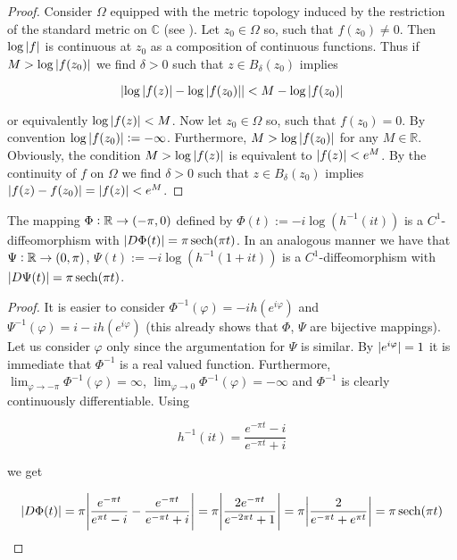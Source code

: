 \begin{proof}
	Consider $\Omega$ equipped with the metric topology induced by the restriction of the standard metric on $\mathbb{C}$ (see \cite[21]{lee:topological_manifolds:2011}). Let $z_0 \in \Omega$ so, such that $f(z_0) \neq 0$. Then $\log\abs[0]{ f}$ is continuous at $z_0$ as a composition of continuous functions. Thus if $M > \log\abs[0]{f(z_0)}$ we find $\delta > 0$ such that $z \in B_\delta(z_0)$ implies 
	
	\begin{equation*}
		\abs[0]{ \log\abs[0]{ f(z)} - \log\abs[0]{ f(z_0)}} < M- \log\abs[0]{ f(z_0)}
	\end{equation*}

	\noindent or equivalently $\log\abs[0]{ f(z)} < M$. Now let $z_0 \in \Omega$ so, such that $f(z_0) = 0$. By convention $\log\abs[0]{ f(z_0)} := -\infty$. Furthermore, $M > \log\abs[0]{ f(z_0)}$ for any $M \in \mathbb{R}$. Obviously, the condition $M > \log\abs[0]{ f(z)}$ is equivalent to $\abs[0]{ f(z)} < e^M$. By the continuity of $f$ on $\Omega$ we find $\delta > 0$ such that $z \in B_\delta(z_0)$ implies $\abs[0]{f(z) - f(z_0)} = \abs[0]{f(z)} < e^M$.
\end{proof}

\begin{lemma}
	The mapping $\Phi: \mathbb{R} \to \intoo{-\pi,0}$ defined by $\Phi(t) := -i\log( h^{-1}(it))$ is a $C^1$-diffeomorphism with $\abs[0]{ D\Phi(t)} = \pi \sech(\pi t)$. In an analogous manner we have that $\Psi: \mathbb{R} \to \intoo{0,\pi}$, $\Psi(t) := -i\log( h^{-1}(1 + it) )$ is a $C^1$-diffeomorphism with $\abs[0]{ D\Psi(t)} = \pi \sech(\pi t)$.
	\label{lem:change_of_variables}
\end{lemma}

\begin{proof}
	It is easier to consider $\Phi^{-1}(\varphi) = -i h(e^{i\varphi})$ and $\Psi^{-1}(\varphi) = i - i h(e^{i\varphi})$ (this already shows that $\Phi$, $\Psi$ are bijective mappings). Let us consider $\varphi$ only since the argumentation for $\Psi$ is similar. By $\abs[0]{ e^{i\varphi}} = 1$ it is immediate that $\Phi^{-1}$ is a real valued function. Furthermore, $\lim_{\varphi \to -\pi} \Phi^{-1}(\varphi) = \infty$, $\lim_{\varphi \rightarrow 0} \Phi^{-1}(\varphi) = -\infty$ and $\Phi^{-1}$ is clearly continuously differentiable. Using
	
	\begin{equation*}
		h^{-1}(it) = \frac{e^{-\pi t} - i}{e^{-\pi t} + i}
	\end{equation*}
	
	\noindent we get

	\begin{gather*}
		\abs[0]{ D\Phi(t)} = \pi\abs{ \frac{e^{-\pi t}}{e^{\pi t} - i} - \frac{e^{-\pi t}}{e^{-\pi t} + i}} = \pi\abs{ \frac{2e^{-\pi t}}{e^{-2\pi t} + 1}} = \pi \abs{ \frac{2}{e^{-\pi t} + e^{\pi t}}}= \pi \sech(\pi t)
	\end{gather*}
\end{proof}

